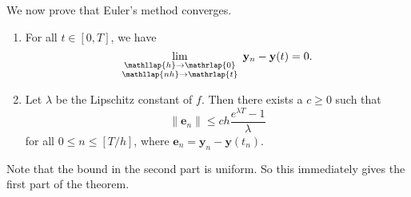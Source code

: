 \documentclass[a4paper]{article}
\begin{document}
We now prove that Euler's method converges.
\begin{thm}\leavevmode
  \begin{enumerate}
    \item For all $t \in [0, T]$, we have
      \[
        \lim_{\substack{\mathllap{h} \to \mathrlap{0}\\\mathllap{nh}\to\mathrlap{t}}}\; \mathbf{y}_n - \mathbf{y}(t) = 0.
      \]
    \item Let $\lambda$ be the Lipschitz constant of $f$. Then there exists a $c \geq 0$ such that
      \[
        \|\mathbf{e}_n\| \leq ch \frac{e^{\lambda T} - 1}{\lambda}
      \]
      for all $0 \leq n \leq [T/h]$, where $\mathbf{e}_n = \mathbf{y}_n - \mathbf{y}(t_n)$.
  \end{enumerate}
\end{thm}
Note that the bound in the second part is uniform. So this immediately gives the first part of the theorem.
\end{document}
